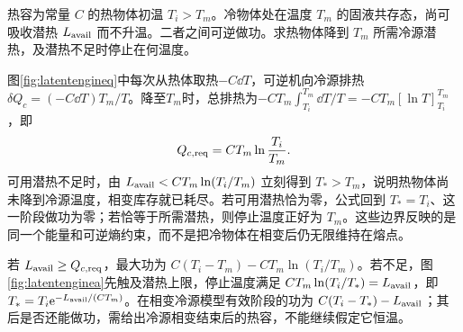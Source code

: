 \begin{exercise}[有限热源与相变冷源]
热容为常量 $C$ 的热物体初温 $T_i>T_m$。冷物体处在温度 $T_m$ 的固液共存态，尚可吸收潜热 $L_{
\rm avail}$ 而不升温。二者之间可逆做功。求热物体降到 $T_m$ 所需冷源潜热，及潜热不足时停止在何温度。
\end{exercise}
\begin{solution}
图\ref{fig:latentengineq}中每次从热体取热$-C\dd T$，可逆机向冷源排热$\delta Q_c=(-C\dd T)T_m/T$。降至$T_m$时，总排热为$-CT_m\int_{T_i}^{T_m}\dd T/T=-CT_m[\ln T]_{T_i}^{T_m}$，即
\[
 Q_{c,\rm req}=CT_m\ln\frac{T_i}{T_m}.
\]
可用潜热不足时，由 $L_{\rm avail}<CT_m\ln(T_i/T_m)$ 立刻得到 $T_*>T_m$，说明热物体尚未降到冷源温度，相变库存就已耗尽。若可用潜热恰为零，公式回到 $T_*=T_i$、这一阶段做功为零；若恰等于所需潜热，则停止温度正好为 $T_m$。这些边界反映的是同一个能量和可逆熵约束，而不是把冷物体在相变后仍无限维持在熔点。

若 $L_{\rm avail}\ge Q_{c,\rm req}$，最大功为 $C(T_i-T_m)-CT_m\ln(T_i/T_m)$。若不足，图\ref{fig:latentenginea}先触及潜热上限，停止温度满足 $CT_m\ln(T_i/T_*)=L_{\rm avail}$，即 $T_*=T_i\mathrm e^{-L_{\rm avail}/(CT_m)}$。在相变冷源模型有效阶段的功为 $C(T_i-T_*)-L_{\rm avail}$；其后是否还能做功，需给出冷源相变结束后的热容，不能继续假定它恒温。
\end{solution}
